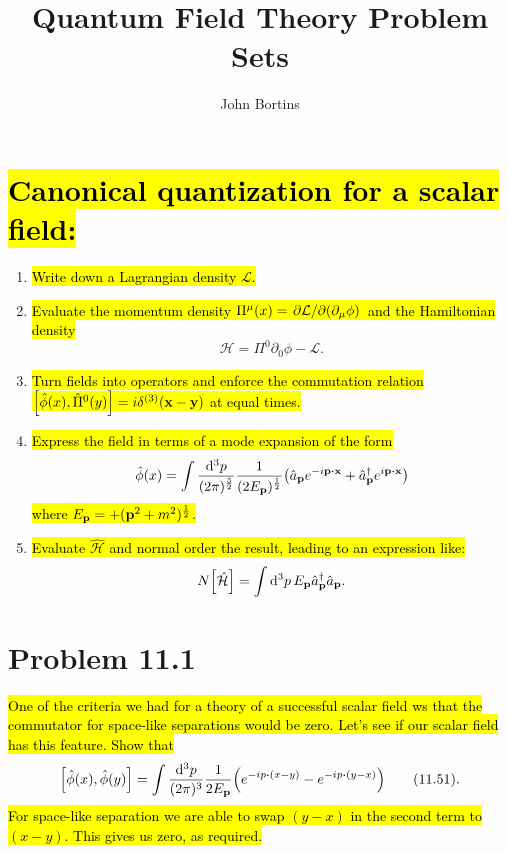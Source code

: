 \documentclass{article}
\title{Quantum Field Theory Problem Sets}
\author{John Bortins}
\begin{document}
\maketitle{}

\section*{\hl{Canonical quantization for a scalar field:}}
\begin{enumerate}[label=\Roman*.]
    \item \hl{Write down a Lagrangian density $\mathcal{L}$.}
    \item \hl{Evaluate the momentum density $\Pi^\mu (x)=\pdv*{\mathcal{L}}{(\partial_\mu \phi)}$ and the Hamiltonian density}
          \[\mathcal{H}=\Pi^0 \partial_0 \phi-\mathcal{L}.\]
    \item \hl{Turn fields into operators and enforce the commutation relation $\bqty{\hat{\phi}(x),\hat{\Pi}^0 (y)}=i\delta^{(3)}(\vb{x}-\vb{y})$ at equal times.}
    \item \hl{Express the field in terms of a mode expansion of the form}
          \[\hat{\phi}(x)=\int\frac{\dd[3]{p}}{(2\pi)^{\frac{3}{2}}}\frac{1}{(2E_{\vb{p}})^{\frac{1}{2}}}\pqty{\hat{a}_{\vb{p}}e^{-i\vb{p}\vdot\vb{x}}+\hat{a}^\dagger_{\vb{p}}e^{i\vb{p}\vdot\vb{x}}} \]
          \hl{where $E_{\vb{p}}=+(\vb{p}^2+m^2)^{\frac{1}{2}}$.}
    \item \hl{Evaluate $\hat{\mathcal{H}}$ and normal order the result, leading to an expression like:}
          \[ N\bqty{\hat{\mathcal{H}}}=\int\dd[3]{p}E_{\vb{p}}\hat{a}^\dagger_{\vb{p}}\hat{a}_{\vb{p}}.\]
\end{enumerate}



\section*{Problem 11.1}
\begin{quoting}
    \hl{One of the criteria we had for a theory of a successful scalar field ws that the commutator for space-like separations would be zero. Let's see if our scalar field has this feature. Show that}\[\bqty{\hat{\phi}(x),\hat{\phi}(y)}=\int\frac{\dd[3]{p}}{(2\pi)^3}\frac{1}{2E_{\vb{p}}}\pqty{e^{-ip\vdot(x-y)}-e^{-ip\vdot(y-x)}}\qquad(11.51).\]\hl{For space-like separation we are able to swap $(y-x)$ in the second term to $(x-y)$. This gives us zero, as required.}
\end{quoting}
\end{document}
